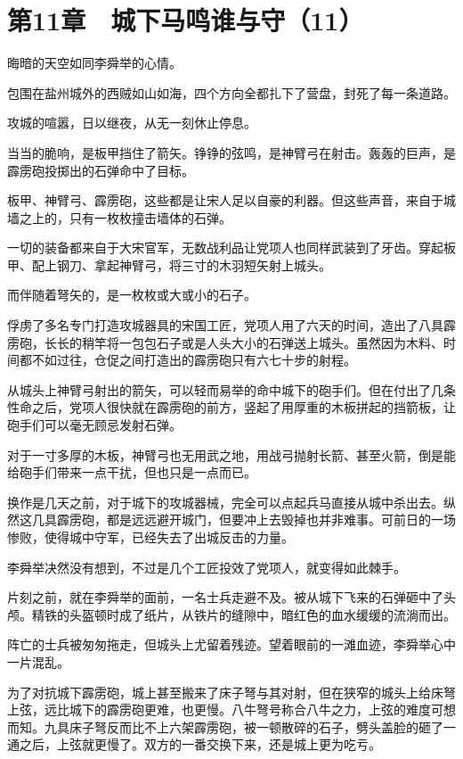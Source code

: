 \section{第11章　城下马鸣谁与守（11）}

晦暗的天空如同李舜举的心情。

包围在盐州城外的西贼如山如海，四个方向全都扎下了营盘，封死了每一条道路。

攻城的喧嚣，日以继夜，从无一刻休止停息。

当当的脆响，是板甲挡住了箭矢。铮铮的弦鸣，是神臂弓在射击。轰轰的巨声，是霹雳砲投掷出的石弹命中了目标。

板甲、神臂弓、霹雳砲，这些都是让宋人足以自豪的利器。但这些声音，来自于城墙之上的，只有一枚枚撞击墙体的石弹。

一切的装备都来自于大宋官军，无数战利品让党项人也同样武装到了牙齿。穿起板甲、配上钢刀、拿起神臂弓，将三寸的木羽短矢射上城头。

而伴随着弩矢的，是一枚枚或大或小的石子。

俘虏了多名专门打造攻城器具的宋国工匠，党项人用了六天的时间，造出了八具霹雳砲，长长的稍竿将一包包石子或是人头大小的石弹送上城头。虽然因为木料、时间都不如过往，仓促之间打造出的霹雳砲只有六七十步的射程。

从城头上神臂弓射出的箭矢，可以轻而易举的命中城下的砲手们。但在付出了几条性命之后，党项人很快就在霹雳砲的前方，竖起了用厚重的木板拼起的挡箭板，让砲手们可以毫无顾忌发射石弹。

对于一寸多厚的木板，神臂弓也无用武之地，用战弓抛射长箭、甚至火箭，倒是能给砲手们带来一点干扰，但也只是一点而已。

换作是几天之前，对于城下的攻城器械，完全可以点起兵马直接从城中杀出去。纵然这几具霹雳砲，都是远远避开城门，但要冲上去毁掉也并非难事。可前日的一场惨败，使得城中守军，已经失去了出城反击的力量。

李舜举决然没有想到，不过是几个工匠投效了党项人，就变得如此棘手。

片刻之前，就在李舜举的面前，一名士兵走避不及。被从城下飞来的石弹砸中了头颅。精铁的头盔顿时成了纸片，从铁片的缝隙中，暗红色的血水缓缓的流淌而出。

阵亡的士兵被匆匆拖走，但城头上尤留着残迹。望着眼前的一滩血迹，李舜举心中一片混乱。

为了对抗城下霹雳砲，城上甚至搬来了床子弩与其对射，但在狭窄的城头上给床弩上弦，远比城下的霹雳砲更难，也更慢。八牛弩号称合八牛之力，上弦的难度可想而知。九具床子弩反而比不上六架霹雳砲，被一顿散碎的石子，劈头盖脸的砸了一通之后，上弦就更慢了。双方的一番交换下来，还是城上更为吃亏。


